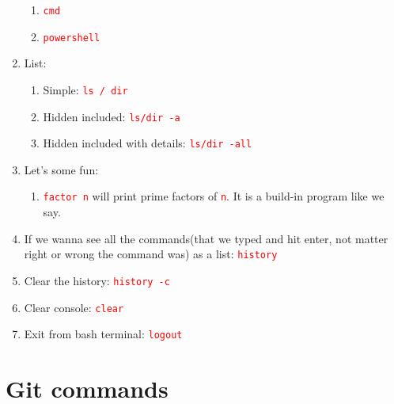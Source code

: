 \documentclass[10 pt]{article}
\newcommand{\R}{\textcolor{red}} %
\newcommand{\T}{\texttt}
\begin{document}
\begin{enumerate}
\begin{enumerate}
			\item \R{\T{cmd}}
			\item \R{\T{powershell}}
		\end{enumerate}
	
	\item List:
		\begin{enumerate}
			\item Simple: \R{\T{ls / dir}}
			\item Hidden included: \R{\T{ls/dir -a}}
			\item Hidden included with details: \R{\T{ls/dir -all}}
		\end{enumerate}
		
	\item Let's some fun:
		\begin{enumerate}
			\item \R{\T{factor n}} will print prime factors of \R{\T{n}}. It is a build-in program like we say.
		\end{enumerate}
	
	\item If we wanna see all the commands(that we typed and hit enter, not matter right or wrong the command was) as a list: \R{\T{history}}
	\item Clear the history: \R{\T{history -c}}
	\item Clear console: \R{\T{clear}}
	\item Exit from bash terminal: \R{\T{logout}}
\end{enumerate}

\section*{Git commands}
\end{document}
